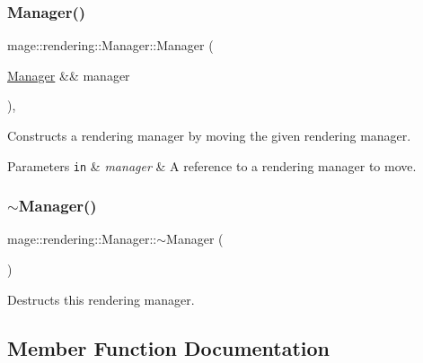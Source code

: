 \subsubsection{\texorpdfstring{Manager()}{Manager()}\hspace{0.1cm}{\footnotesize\ttfamily [3/3]}}
{\footnotesize\ttfamily mage\+::rendering\+::\+Manager\+::\+Manager (\begin{DoxyParamCaption}\item[{\mbox{\hyperlink{classmage_1_1rendering_1_1_manager}{Manager}} \&\&}]{manager }\end{DoxyParamCaption})\hspace{0.3cm}{\ttfamily [default]}, {\ttfamily [noexcept]}}

Constructs a rendering manager by moving the given rendering manager.


\begin{DoxyParams}[1]{Parameters}
\mbox{\tt in}  & {\em manager} & A reference to a rendering manager to move. \\
\hline
\end{DoxyParams}
\mbox{\label{classmage_1_1rendering_1_1_manager_a9b43ab8313e441faadb60863759bbc46}} 
\subsubsection{\texorpdfstring{$\sim$\+Manager()}{~Manager()}}
{\footnotesize\ttfamily mage\+::rendering\+::\+Manager\+::$\sim$\+Manager (\begin{DoxyParamCaption}{ }\end{DoxyParamCaption})\hspace{0.3cm}{\ttfamily [default]}}

Destructs this rendering manager. 

\subsection{Member Function Documentation}
\mbox{\label{classmage_1_1rendering_1_1_manager_ac46b7739c7005b5a7248642ffc8299d7}} 
